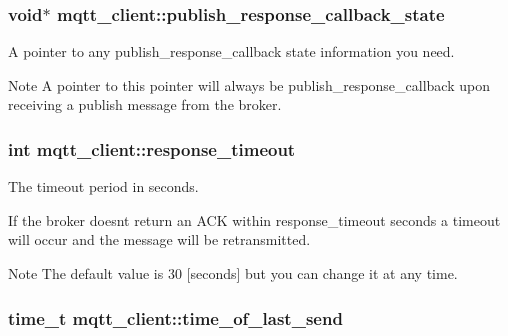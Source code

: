 \subsubsection[{\texorpdfstring{publish\+\_\+response\+\_\+callback\+\_\+state}{publish_response_callback_state}}]{\setlength{\rightskip}{0pt plus 5cm}void$\ast$ mqtt\+\_\+client\+::publish\+\_\+response\+\_\+callback\+\_\+state}\hypertarget{structmqtt__client_a948d816462128ef2216c230644407f21}{}\label{structmqtt__client_a948d816462128ef2216c230644407f21}


A pointer to any publish\+\_\+response\+\_\+callback state information you need. 

\begin{DoxyNote}{Note}
A pointer to this pointer will always be publish\+\_\+response\+\_\+callback upon receiving a publish message from the broker. 
\end{DoxyNote}
\subsubsection[{\texorpdfstring{response\+\_\+timeout}{response_timeout}}]{\setlength{\rightskip}{0pt plus 5cm}int mqtt\+\_\+client\+::response\+\_\+timeout}\hypertarget{structmqtt__client_a4ee652148f2b1b338f1527a85879e970}{}\label{structmqtt__client_a4ee652148f2b1b338f1527a85879e970}


The timeout period in seconds. 

If the broker doesn\textquotesingle{}t return an A\+CK within response\+\_\+timeout seconds a timeout will occur and the message will be retransmitted.

\begin{DoxyNote}{Note}
The default value is 30 \mbox{[}seconds\mbox{]} but you can change it at any time. 
\end{DoxyNote}
\subsubsection[{\texorpdfstring{time\+\_\+of\+\_\+last\+\_\+send}{time_of_last_send}}]{\setlength{\rightskip}{0pt plus 5cm}time\+\_\+t mqtt\+\_\+client\+::time\+\_\+of\+\_\+last\+\_\+send}\hypertarget{structmqtt__client_a48619e2ebe592a9757a3bda1ac97608d}{}\label{structmqtt__client_a48619e2ebe592a9757a3bda1ac97608d}


